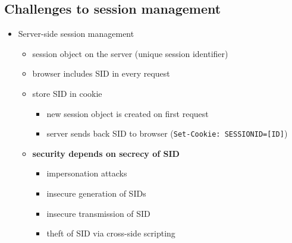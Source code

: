 \documentclass[12pt,titlepage,a4paper]{report}
\begin{document}
			\subsection{Challenges to session management}
			\begin{itemize}
				\item Server-side session management
				\begin{itemize}
					\item session object on the server (unique session identifier)
					\item browser includes SID in every request
					\item store SID in cookie
					\begin{itemize}
						\item new session object is created on first request
						\item server sends back SID to browser (\texttt{Set-Cookie: SESSIONID=[ID]})
					\end{itemize}
					\item \textbf{security depends on secrecy of SID}
					\begin{itemize}
						\item impersonation attacks
						\item insecure generation of SIDs
						\item insecure transmission of SID
						\item theft of SID via cross-side scripting
					\end{itemize}
				\end{itemize}
			

\end{itemize}
\end{document}
